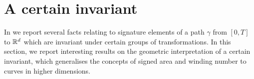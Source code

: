 \iffalse
Using an algorithmic procedure,
some invariants to certain subgroups of $G \subset \GL(\R^\ds)$ are derived.
In particular for $\ds=2$ and $G=\GL(\R^\ds)$ the following invariants are given
\begin{align*}
  I_1 &= \frac{1}{2} \int_0^T X^1_{0,r} dX^2_r - \frac{1}{2} X^1_{0,t} X^2_{0,t}  \\
  I_2 &= \int_0^T X^1_{0,r} X^2_{0,r} dX^2_r\ X^1_{0,t} - \frac{1}{2} \int_0^t (X^1_r)^2 dX^2_r\ X^2_{0,t} \\
  I_3 &= \int_0^T X^1_{0,r} (X^2_{0,r})^2 dX^2_r\ X^2_{0,T} - \int_0^T (X^1_{0,r})^2 X^2_{0,r} dX^2_r\ X^1_{0,T} X^2_{0,T}
          + \frac{1}{3} \int_0^T (X^1_{0,r})^3 dX^2_r\ X^2_{0,r} X^2_{0,r} \\
          &\qquad
          - \frac{1}{12} (X^1_{0,t})^3 (X^2_{0,t})^3.
\end{align*}
By the shuffle identity, \eqref{eq:shuffle},%
we can write these as $I_i = \langle S(X)_{0,T}, \phi_i \rangle$, with
\begin{align*}
  \phi_1 &:= \frac{1}{2} \word{12} - \frac{1}{2} \word{12} \\
  \phi_2 &:= \frac13 \word{1221}
                            +\frac13 \word{1212}
                            -\frac23 \word{1122}
                            +\frac13 \word{2121}
                            +\frac13 \word{2112}
                            -\frac23 \word{2211} \\
  \phi_3 &:= - \word{121212} - \word{211122} + \word{212121} + \word{221112} - \word{121221} + \word{122211} - \word{112212}
  \\&\qquad + \word{122112}
    - \word{211212} - \word{211221} - \word{121122} + \word{122121} -3 \word{222111} +3 \word{111222} 
    \\&\qquad+ \word{221121} + \word{212211}
     - \word{112122}
    + \word{212112} - \word{112221} + \word{221211}.
\end{align*}
\fi

\section{A certain invariant}
\label{sec:myInvariant}
In \cite{invariants} we report several facts relating to signature elements of a path $\gamma$ from $[0,T]$ to $\mathbb{R}^d$ which are invariant under certain groups of transformations.
In this section, we report interesting results on the geometric interpretation of a certain invariant, which generalises the concepts of signed area and winding number to curves in higher dimensions.

